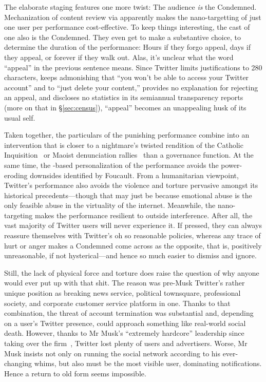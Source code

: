 The elaborate staging features one more twist: The audience \emph{is} the
Condemned. Mechanization of content review via  apparently makes the
nano-targetting of just one user per performance cost-effective. To keep things
interesting, the cast of one also is the Condemned. They even get to make a
substantive choice, to determine the duration of the performance: Hours if they
forgo appeal, days if they appeal, or forever if they walk out. Alas, it's
unclear what the word ``appeal'' in the previous sentence means. Since Twitter
limits justifications to 280 characters, keeps admonishing that ``you won't be
able to access your Twitter account'' and to ``just delete your content,''
provides no explanation for rejecting an appeal, and discloses no statistics in
its semiannual transparency reports (more on that in \S\ref{sec:census}),
``appeal'' becomes an unappealing husk of its usual self.

Taken together, the particulars of the punishing performance combine into an
intervention that is closer to a nightmare's twisted rendition of the Catholic
Inquisition~\cite{Lea1906a,Lea1906b,Lea1906c,Lea1906d} or Maoist denunciation
rallies~\cite{Yang2021} than a governance function. At the same time, the
-based personalization of the performance avoids the power-eroding
downsides identified by Foucault. From a humanitarian viewpoint, Twitter's
performance also avoids the violence and torture pervasive amongst its
historical precedents---though that may just be because emotional abuse is the
only feasible abuse in the virtuality of the internet. Meanwhile, the
nano-targeting makes the performance resilient to outside interference. After
all, the vast majority of Twitter users will never experience it. If pressed,
they can always reassure themselves with Twitter's oh so reasonable policies,
whereas any trace of hurt or anger makes a Condemned come across as the
opposite, that is, positively unreasonable, if not hysterical---and hence so
much easier to dismiss and ignore.

Still, the lack of physical force and torture does raise the question of why
anyone would ever put up with that shit. The reason was pre-Musk Twitter's
rather unique position as breaking news service, political townsquare,
professional society, and corporate customer service platform in one. Thanks to
that combination, the threat of account termination was substantial and,
depending on a user's Twitter presence, could approach something like real-world
social death. However, thanks to Mr Musk's ``extremely hardcore'' leadership
since taking over the firm~\cite{SchifferNewtonea2023}, Twitter lost plenty of
users and advertisers. Worse, Mr Musk insists not only on running the social
network according to his ever-changing whims, but also must be the most visible
user, dominating notifications. Hence a return to old form seems impossible.


